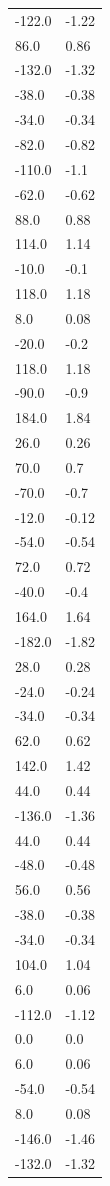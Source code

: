 \begin{longtable}{ll}
-122.0 & -1.22 \\
86.0 & 0.86 \\
-132.0 & -1.32 \\
-38.0 & -0.38 \\
-34.0 & -0.34 \\
-82.0 & -0.82 \\
-110.0 & -1.1 \\
-62.0 & -0.62 \\
88.0 & 0.88 \\
114.0 & 1.14 \\
-10.0 & -0.1 \\
118.0 & 1.18 \\
8.0 & 0.08 \\
-20.0 & -0.2 \\
118.0 & 1.18 \\
-90.0 & -0.9 \\
184.0 & 1.84 \\
26.0 & 0.26 \\
70.0 & 0.7 \\
-70.0 & -0.7 \\
-12.0 & -0.12 \\
-54.0 & -0.54 \\
72.0 & 0.72 \\
-40.0 & -0.4 \\
164.0 & 1.64 \\
-182.0 & -1.82 \\
28.0 & 0.28 \\
-24.0 & -0.24 \\
-34.0 & -0.34 \\
62.0 & 0.62 \\
142.0 & 1.42 \\
44.0 & 0.44 \\
-136.0 & -1.36 \\
44.0 & 0.44 \\
-48.0 & -0.48 \\
56.0 & 0.56 \\
-38.0 & -0.38 \\
-34.0 & -0.34 \\
104.0 & 1.04 \\
6.0 & 0.06 \\
-112.0 & -1.12 \\
0.0 & 0.0 \\
6.0 & 0.06 \\
-54.0 & -0.54 \\
8.0 & 0.08 \\
-146.0 & -1.46 \\
-132.0 & -1.32 \\

\end{longtable}
